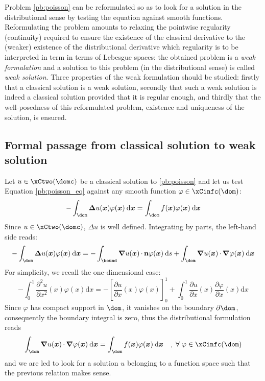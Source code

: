 Problem \eqref{pb:poisson} can be reformulated so as to look for a solution in the distributional sense by testing the equation against smooth functions.
Reformulating the problem amounts to relaxing the pointwise regularity (\ie continuity) required to ensure the existence of the classical derivative to the (weaker) existence of the distributional derivative which regularity is to be interpreted in term in terms of Lebesgue spaces: the obtained problem is a \textit{weak formulation} and a solution to this problem (\ie in the distributional sense) is called \textit{weak solution}.
Three properties of the weak formulation should be studied: firstly that a classical solution is a weak solution, secondly that such a weak solution is indeed a classical solution provided that it is regular enough, and thirdly that the well-posedness of this reformulated problem, \ie existence and uniqueness of the solution, is ensured.


\subsection{Formal passage from classical solution to weak solution}

Let $u \in \xCtwo(\domc)$ be a classical solution to \eqref{pb:poisson} and let us test Equation \eqref{pb:poisson_eq} against any smooth function $\varphi\in\xCinfc(\dom)$:
\begin{equation*}
- \int_\dom \Lap u(\xx) \varphi(\xx) \dxx = \int_\dom f(\xx) \varphi(\xx)  \dxx
\end{equation*}
Since $u \in \xCtwo(\domc)$, $\Delta u$ is well defined. Integrating by parts, the left-hand side reads:
\begin{equation*}
- \int_\dom \Lap u(\xx) \varphi(\xx) \dxx = - \int_\bound \Grad u(\xx) \xDot \n \varphi(\xx) \ds + \int_\dom \Grad u(\xx)\xDot \Grad \varphi(\xx) \dxx
\end{equation*}
For simplicity, we recall the one-dimensional case:
\begin{equation*}
- \int_0^1 \frac{\partial^2 u}{\partial x^2}(x)  \varphi(x) {\mathrm d}x = - \left[ \frac{\partial u}{\partial x}(x) \varphi(x) \right]_0^1 + \int_0^1 \frac{\partial u}{\partial x}(x) \frac{\partial \varphi}{\partial x}(x) {\mathrm d}x
\end{equation*}
Since $\varphi$ has compact support in $\dom$, it vanishes on the boundary $\partial\dom$, consequently the boundary integral is zero, thus the distributional formulation reads
\begin{equation*}
\int_\dom \Grad u(\xx)\xDot \Grad \varphi(\xx) \dxx = \int_\dom f(\xx) \varphi(\xx)  \dxx\quad,\;\forany\varphi\in\xCinfc(\dom)
\end{equation*}
and we are led to look for a solution $u$ belonging to a function space such that the previous relation makes sense.

